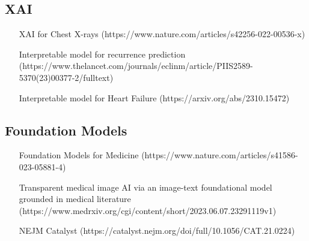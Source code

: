 \subsection{XAI}
\begin{itemize}
    \item [XAI for Chest X-rays](https://www.nature.com/articles/s42256-022-00536-x)
    \item [Interpretable model for recurrence prediction](https://www.thelancet.com/journals/eclinm/article/PIIS2589-5370(23)00377-2/fulltext)
    \item [Interpretable model for Heart Failure](https://arxiv.org/abs/2310.15472)
\end{itemize}

\subsection{Foundation Models}
\begin{itemize}
    \item [Foundation Models for Medicine](https://www.nature.com/articles/s41586-023-05881-4)
    \item [Transparent medical image AI via an image-text foundational model grounded in medical literature](https://www.medrxiv.org/cgi/content/short/2023.06.07.23291119v1)
    \item [NEJM Catalyst](https://catalyst.nejm.org/doi/full/10.1056/CAT.21.0224)
\end{itemize}

